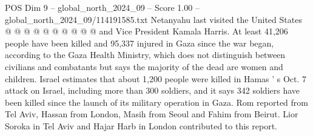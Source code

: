 \begin{textsample}{POS Dim 9 – global\_north\_2024\_09 – Score 1.00 – global\_north\_2024\_09/114191585.txt}
Netanyahu last visited the United States @ @ @ @ @ @ @ @ @ @ and Vice President Kamala Harris.
At least 41,206 people have been killed and 95,337 injured in Gaza since the war began, according to the Gaza Health Ministry, which does not distinguish between civilians and combatants but says the majority of the dead are women and children.
Israel estimates that about 1,200 people were killed in Hamas ' s Oct. 7 attack on Israel, including more than 300 soldiers, and it says 342 soldiers have been killed since the launch of its military operation in Gaza.
Rom reported from Tel Aviv, Hassan from London, Masih from Seoul and Fahim from Beirut.
Lior Soroka in Tel Aviv and Hajar Harb in London contributed to this report.

\end{textsample}
